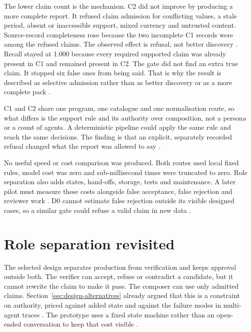 The lower claim count is the mechanism. C2 did not improve by producing a more complete report. It
refused claim admission for conflicting values, a stale period, absent or inaccessible support, mixed
currency and untrusted content. Source-record completeness rose because the two incomplete C1 records
were among the refused claims. The observed effect is refusal, not better discovery
\citep{gao2023alce,gebru2021datasheets}. Recall stayed at 1.000 because every required supported
claim was already present in C1 and remained present in C2. The gate did not find an extra true
claim. It stopped six false ones from being said. That is why the result is described as
selective admission rather than as better discovery or as a more complete pack
\citep{gao2023rarr,peffers2007dsrm}.

C1 and C2 share one program, one catalogue and one normalisation route, so what differs is the
support rule and its authority over composition, not a persona or a count of agents. A deterministic
pipeline could apply the same rule and reach the same decisions. The finding is that an explicit,
separately recorded refusal changed what the report was allowed to say
\citep{guo2024multiagent,fu2026agents,wu2024autogen}.

No useful speed or cost comparison was produced. Both routes used local fixed rules, model cost was
zero and sub-millisecond times were truncated to zero. Role separation also adds states, hand-offs,
storage, tests and maintenance. A later pilot must measure these costs alongside false acceptance,
false rejection and reviewer work \citep{pineau2021reproducibility,hevner2004design}. D0 cannot
estimate false rejection outside its visible designed cases, so a similar gate could refuse a valid
claim in new data \citep{kapoor2023leakage,nist2023airmf}.

\section{Role separation revisited}

The selected design separates production from verification and keeps approval outside both. The
verifier can accept, refuse or contradict a candidate, but it cannot rewrite the claim to make it
pass. The composer can use only admitted claims. Section~\ref{sec:design-alternatives} already argued
that this is a constraint on authority, priced against added state and against the failure modes in
multi-agent traces \citep{cemri2025masfailures,nist2023airmf}. The prototype uses a fixed state
machine rather than an open-ended conversation to keep that cost visible
\citep{guo2024multiagent,wu2024autogen}.

